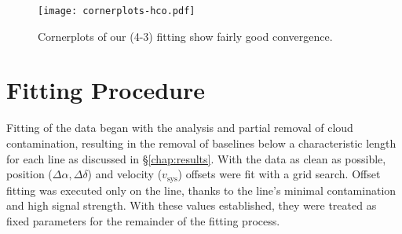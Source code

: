 
\begin{figure}[htp]
  \hspace*{\fill}%
  \texttt{[image: cornerplots-hco.pdf]}\hfill%
  \hspace*{\fill}%
  \caption{Cornerplots of our \hco(4-3) fitting show fairly good convergence.}
  \label{fig:cornerplot_hco}
\end{figure}





\section{Fitting Procedure}
\label{section:fitting_procedure}

Fitting of the data began with the analysis and partial removal of cloud contamination, resulting in the removal of baselines below a characteristic length for each line as discussed in \S\ref{chap:results}. With the data as clean as possible, position ($\Delta \alpha, \Delta \delta$) and velocity ($v_\text{sys}$) offsets were fit with a grid search. Offset fitting was executed only on the \hco line, thanks to the line's minimal contamination and high signal strength. With these values established, they were treated as fixed parameters for the remainder of the fitting process.

